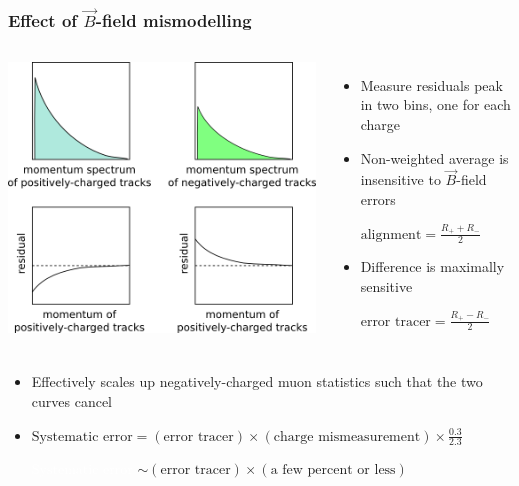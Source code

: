 \documentclass[compress]{beamer}
\begin{document}
\begin{frame}
\frametitle{Effect of $\vec{B}$-field mismodelling}

\vspace{0.5 cm}
\begin{columns}
\includegraphics[width=\linewidth]{momentum_explanation.png}

\vspace{-1 cm}
\begin{itemize}
\item Measure residuals peak in two bins, one for each charge
\item Non-weighted average is insensitive to $\vec{B}$-field errors

$\displaystyle \mbox{alignment} = \frac{R_+ + R_-}{2}$

\item Difference is maximally sensitive

$\displaystyle \mbox{error tracer} = \frac{R_+ - R_-}{2}$

\end{itemize}
\end{columns}

\begin{itemize}
\item Effectively scales up negatively-charged muon statistics such that the two curves cancel
\item \mbox{$\displaystyle \mbox{Systematic error} = \left(\mbox{error tracer}\right) \times \left(\mbox{charge mismeasurement}\right) \times \frac{0.3}{2.3}$}

\textcolor{white}{$\mbox{Systematic error}$} $\sim \left(\mbox{error tracer}\right) \times \left(\mbox{a few percent or less}\right)$

\end{itemize}
\end{frame}
\end{document}
